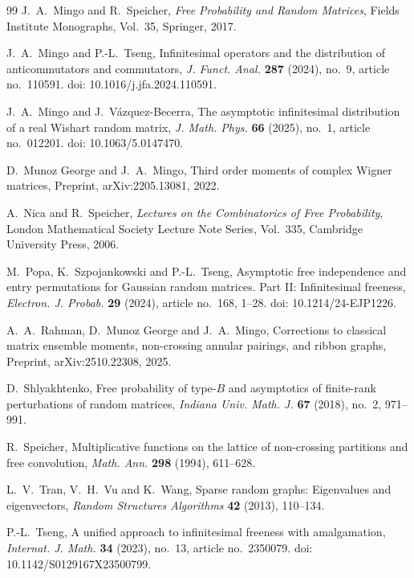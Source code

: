 \documentclass{article}
\theoremstyle{definition}
\begin{document}
{\begin{thebibliography}{99}
J.~A.~Mingo and R.~Speicher,
\newblock \emph{Free Probability and Random Matrices},
\newblock Fields Institute Monographs, Vol.~35,
Springer, 2017.

J.~A.~Mingo and P.-L.~Tseng,
\newblock Infinitesimal operators and the distribution
of anticommutators and commutators,
\newblock \emph{J. Funct. Anal.}
\textbf{287} (2024), no.~9, article no.~110591.
\newblock doi: 10.1016/j.jfa.2024.110591.

J.~A.~Mingo and J.~V\'azquez-Becerra,
\newblock The asymptotic infinitesimal distribution
of a real Wishart random matrix,
\newblock \emph{J. Math. Phys.}
\textbf{66} (2025), no.~1, article no.~012201.
\newblock doi: 10.1063/5.0147470.

D.~Munoz George and J.~A.~Mingo,
\newblock Third order moments of complex Wigner matrices,
\newblock Preprint, arXiv:2205.13081, 2022.

A.~Nica and R.~Speicher,
\newblock \emph{Lectures on the Combinatorics of Free Probability},
\newblock London Mathematical Society Lecture Note Series, Vol.~335,
Cambridge University Press, 2006.

M.~Popa, K.~Szpojankowski and P.-L.~Tseng,
\newblock Asymptotic free independence and entry permutations
for Gaussian random matrices. Part II: Infinitesimal freeness,
\newblock \emph{Electron. J. Probab.}
\textbf{29} (2024), article no.~168, 1--28.
\newblock doi: 10.1214/24-EJP1226.

A.~A.~Rahman, D.~Munoz George and J.~A.~Mingo,
\newblock Corrections to classical matrix ensemble moments,
non-crossing annular pairings, and ribbon graphs,
\newblock Preprint, arXiv:2510.22308, 2025.

D.~Shlyakhtenko,
\newblock Free probability of type-$B$ and asymptotics
of finite-rank perturbations of random matrices,
\newblock \emph{Indiana Univ. Math. J.}
\textbf{67} (2018), no.~2, 971--991.

R.~Speicher,
\newblock Multiplicative functions on the lattice of non-crossing
partitions and free convolution,
\newblock \emph{Math. Ann.}
\textbf{298} (1994), 611--628.

L.~V.~Tran, V.~H.~Vu and K.~Wang,
\newblock Sparse random graphs: Eigenvalues and eigenvectors,
\newblock \emph{Random Structures Algorithms}
\textbf{42} (2013), 110--134.

P.-L.~Tseng,
\newblock A unified approach to infinitesimal freeness
with amalgamation,
\newblock \emph{Internat. J. Math.}
\textbf{34} (2023), no.~13, article no.~2350079.
\newblock doi: 10.1142/S0129167X23500799.


\end{thebibliography}}
\end{document}
